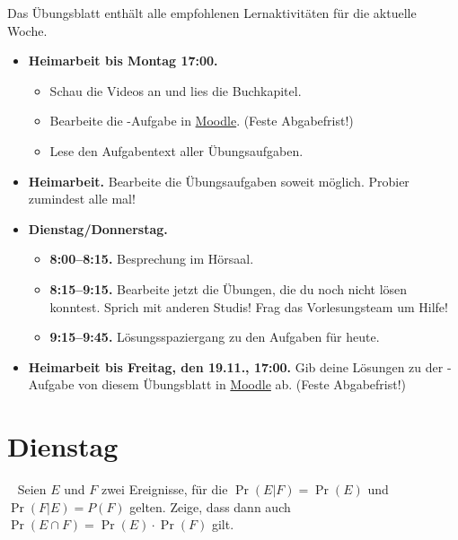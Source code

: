 \documentclass{uebung_cs}
\begin{document}
Das Übungsblatt enthält alle empfohlenen Lernaktivitäten für die aktuelle Woche.

\begin{itemize}
\item \textbf{Heimarbeit bis Montag 17:00.}
    \begin{itemize}
    \item 
    Schau die Videos an und lies die Buchkapitel.
    \item Bearbeite die -Aufgabe in \href{https://moodle.studiumdigitale.uni-frankfurt.de/moodle/course/view.php?id=2241}{Moodle}. (Feste Abgabefrist!)
    \item Lese den Aufgabentext aller Übungsaufgaben.
    \end{itemize}
\item \textbf{Heimarbeit.} Bearbeite die Übungsaufgaben soweit möglich. Probier zumindest alle mal!
\item \textbf{Dienstag/Donnerstag.}
\begin{itemize}
    \item \textbf{8:00--8:15.} Besprechung im Hörsaal.
    \item \textbf{8:15--9:15.} Bearbeite jetzt die Übungen, die du noch nicht lösen konntest. Sprich mit anderen Studis! Frag das Vorlesungsteam um Hilfe!
    \item \textbf{9:15--9:45.} Lösungsspaziergang zu den Aufgaben für heute.
\end{itemize}

\item \textbf{Heimarbeit bis Freitag, den 19.11., 17:00.} Gib deine Lösungen zu der -Aufgabe von diesem Übungsblatt in \href{https://moodle.studiumdigitale.uni-frankfurt.de/moodle/course/view.php?id=2241}{Moodle} ab. (Feste Abgabefrist!)
\end{itemize}

\section*{Dienstag}

\begin{aufgabe}[Wahrscheinlichkeitsrechnung]\
	Seien $E$ und $F$ zwei Ereignisse, für die $\Pr(E | F) = \Pr(E)$ und $\Pr(F | E) = P(F)$ gelten. Zeige, dass dann auch $\Pr(E \cap F) = \Pr(E) \cdot \Pr(F)$ gilt.
\end{aufgabe}
\end{document}
